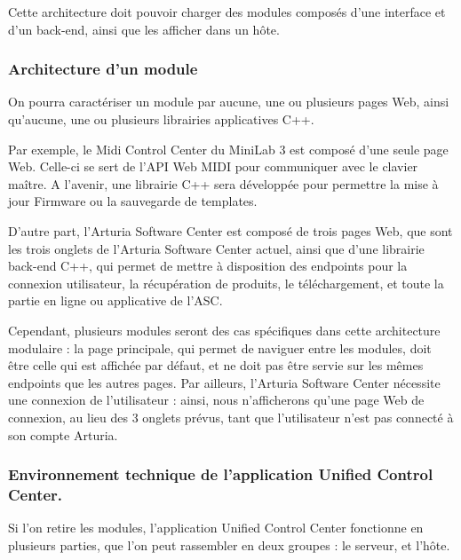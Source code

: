 \documentclass[francais]{rapportPFE}  %
\begin{document}
Cette architecture doit pouvoir charger des modules composés d'une interface et d'un back-end, ainsi que les afficher dans un hôte.

\subsubsection{Architecture d'un module}

On pourra caractériser un module par aucune, une ou plusieurs pages Web, ainsi qu'aucune, une ou plusieurs librairies applicatives C++.

Par exemple, le Midi Control Center du MiniLab 3 est composé d'une seule page Web. Celle-ci se sert de l'API Web MIDI pour communiquer avec le clavier maître. A l'avenir, une librairie C++ sera développée pour permettre la mise à jour Firmware ou la sauvegarde de templates.

D'autre part, l'Arturia Software Center est composé de trois pages Web, que sont les trois onglets de l'Arturia Software Center actuel, ainsi que d'une librairie back-end C++, qui permet de mettre à disposition des endpoints pour la connexion utilisateur, la récupération de produits, le téléchargement, et toute la partie en ligne ou applicative de l'ASC.

Cependant, plusieurs modules seront des cas spécifiques dans cette architecture modulaire :
la page principale, qui permet de naviguer entre les modules, doit être celle qui est affichée par défaut, et ne doit pas être servie sur les mêmes endpoints que les autres pages.
Par ailleurs, l'Arturia Software Center nécessite une connexion de l'utilisateur : ainsi, nous n'afficherons qu'une page Web de connexion, au lieu des 3 onglets prévus, tant que l'utilisateur n'est pas connecté à son compte Arturia.



\subsubsection{Environnement technique de l'application Unified Control Center.}

Si l'on retire les modules, l'application Unified Control Center fonctionne en plusieurs parties, que l'on peut rassembler en deux groupes : le serveur, et l'hôte.
\end{document}
